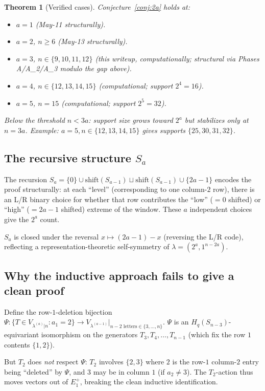 \documentclass[11pt]{article}
\newtheorem{theorem}{Theorem}
\theoremstyle{definition}
\begin{document}
\begin{theorem}[Verified cases]\label{thm:verify-conj}
Conjecture~\ref{conj:2a} holds at:
\begin{itemize}[leftmargin=2em,topsep=0.3em,itemsep=0.2em]
\item $a=1$ (May-11 structurally).
\item $a=2$, $n\ge 6$ (May-13 structurally).
\item $a=3$, $n\in\{9,10,11,12\}$ (this writeup, computationally;
structural via Phases A/A_2/A_3 modulo the gap above).
\item $a=4$, $n\in\{12,13,14,15\}$ (computational; support
$2^4=16$).
\item $a=5$, $n=15$ (computational; support $2^5=32$).
\end{itemize}

Below the threshold $n<3a$: support size grows toward $2^a$ but
stabilizes only at $n=3a$.  Example: $a=5,n\in\{12,13,14,15\}$
gives supports $\{25,30,31,32\}$.
\end{theorem}

\subsection{The recursive structure $S_a$}

The recursion $S_a=\{0\}\cup\mathrm{shift}(S_{a-1})\sqcup
\mathrm{shift}(S_{a-1})\cup\{2a-1\}$ encodes the proof structurally:
at each ``level'' (corresponding to one column-$2$ row), there is
an L/R binary choice for whether that row contributes the ``low''
($=0$ shifted) or ``high'' ($=2a-1$ shifted) extreme of the
window.  These $a$ independent choices give the $2^a$ count.

$S_a$ is closed under the reversal $x\mapsto(2a-1)-x$ (reversing
the L/R code), reflecting a representation-theoretic
self-symmetry of $\lambda=(2^a,1^{n-2a})$.

\subsection{Why the inductive approach fails to give a clean proof}

Define the row-$1$-deletion bijection $\Psi:\{T\in
V_{\lambda^{(a)}|n}:a_1=2\}\to V_{\lambda^{(a-1)}}|_{n-2\text{ letters}\in\{3,\ldots,n\}}$.
$\Psi$ is an $H_q(S_{n-3})$-equivariant isomorphism on the
generators $T_3,T_4,\ldots,T_{n-1}$ (which fix the row $1$
contents $\{1,2\}$).

But $T_2$ does \emph{not} respect $\Psi$: $T_2$ involves $\{2,3\}$
where $2$ is the row-$1$ column-$2$ entry being ``deleted'' by
$\Psi$, and $3$ may be in column $1$ (if $a_2\ne 3$).  The
$T_2$-action thus moves vectors out of $E_1^+$, breaking the
clean inductive identification.
\end{document}
